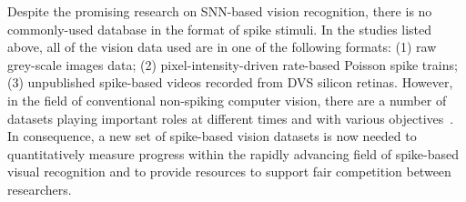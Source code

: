 Despite the promising research on SNN-based vision recognition, there is no commonly-used database in the format of spike stimuli.
In the studies listed above, all of the vision data used are in one of the following formats:
(1) raw grey-scale images data;
(2) pixel-intensity-driven rate-based Poisson spike trains;
(3) unpublished spike-based videos recorded from DVS silicon retinas.
However, in the field of conventional non-spiking computer vision, there are a number of datasets playing important roles at different times and with various objectives~\cite{lecun1998gradient,deng2009imagenet,blank2005actions,liu2009recognizing}.
In consequence, a new set of spike-based vision datasets is now needed to quantitatively measure progress within the rapidly advancing field of spike-based visual recognition and to provide resources to support fair competition between researchers.

